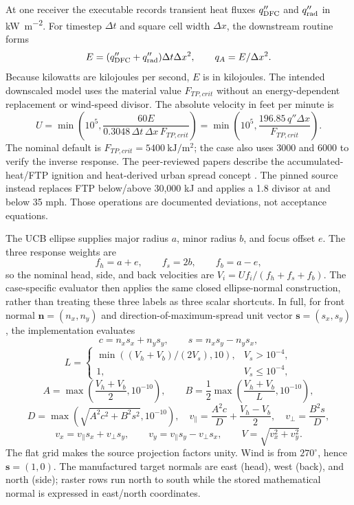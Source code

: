At one receiver the executable records transient heat fluxes
\(q''_{\mathrm{DFC}}\) and \(q''_{\rm rad}\) in \si{\kilo\watt\per\square\metre}.
For timestep \(\Delta t\) and square cell width \(\Delta x\), the downstream
routine forms
\[
 E=(q''_{\mathrm{DFC}}+q''_{\rm rad})\Delta t\Delta x^2,
 \qquad q_A=E/\Delta x^2 .
\]
Because kilowatts are kilojoules per second, \(E\) is in kilojoules. The
intended downscaled model uses the material value $F_{TP,crit}$ without an
energy-dependent replacement or wind-speed divisor. The absolute velocity in
feet per minute is
\[
 U=\min\!\left(10^5,
 \frac{60E}{0.3048\,\Delta t\,\Delta x\,F_{TP,crit}}\right)
 =\min\!\left(10^5,\frac{196.85\,q''\Delta x}{F_{TP,crit}}\right).
\]
The nominal default is $F_{TP,crit}=5400~\si{\kilo\joule\per\square\metre}$;
the case also uses 3000 and 6000 to verify the inverse response. The
peer-reviewed papers describe the accumulated-heat/FTP ignition and
heat-derived urban spread concept \cite{PurnomoPCI2024,PurnomoIJWF2024}.
The pinned source instead replaces FTP below/above 30,000 kJ and applies a
1.8 divisor at and below 35 mph. Those operations are documented deviations,
not acceptance equations.

The UCB ellipse supplies major radius \(a\), minor radius \(b\), and focus
offset \(e\).  The three response weights are
\[
 f_h=a+e,\qquad f_s=2b,\qquad f_b=a-e,
\]
so the nominal head, side, and back velocities are
\(V_i=Uf_i/(f_h+f_s+f_b)\).  The case-specific evaluator then applies the same
closed ellipse-normal construction, rather than treating these three labels as
three scalar shortcuts.  In full, for front normal
\(\boldsymbol n=(n_x,n_y)\) and direction-of-maximum-spread unit vector
\(\boldsymbol s=(s_x,s_y)\), the implementation evaluates
\[
 c=n_xs_x+n_ys_y,\qquad s=n_xs_y-n_ys_x,
\]
\[
 L=\begin{cases}
 \min\!\left((V_h+V_b)/(2V_s),10\right),&V_s>10^{-4},\\
 1,&V_s\leq10^{-4},
 \end{cases}
\]
\[
 A=\max\!\left(\frac{V_h+V_b}{2},10^{-10}\right),\qquad
 B=\frac12\max\!\left(\frac{V_h+V_b}{L},10^{-10}\right),
\]
\[
 D=\max\!\left(\sqrt{A^2c^2+B^2s^2},10^{-10}\right),\quad
 v_{\parallel}=\frac{A^2c}{D}+\frac{V_h-V_b}{2},\quad
 v_{\perp}=\frac{B^2s}{D},
\]
\[
 v_x=v_{\parallel}s_x+v_{\perp}s_y,\qquad
 v_y=v_{\parallel}s_y-v_{\perp}s_x,\qquad
 V=\sqrt{v_x^2+v_y^2}.
\]
The flat grid makes the source projection factors unity.  Wind is from
\(270^\circ\), hence \(\boldsymbol s=(1,0)\).  The manufactured target normals
are east (head), west (back), and north (side); raster rows run north to south
while the stored mathematical normal is expressed in east/north coordinates.

